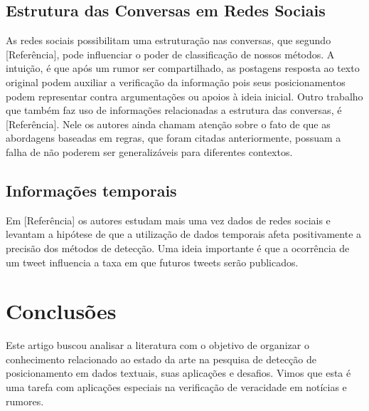 \subsection{Estrutura das Conversas em Redes Sociais}

\quad As redes sociais possibilitam uma estruturação nas conversas, 
que segundo [Referência], pode influenciar o poder de classificação de nossos
métodos. A intuição, é que após um rumor ser compartilhado, as postagens resposta ao
texto original podem auxiliar a verificação da informação pois seus
posicionamentos podem representar contra argumentações ou apoios à ideia
inicial. Outro trabalho que também faz uso de informações relacionadas a
estrutura das conversas, é [Referência]. Nele os autores ainda chamam
atenção sobre o fato de que as abordagens baseadas em regras, que foram
citadas anteriormente, possuam a falha de não poderem ser generalizáveis
para diferentes contextos.

\subsection{Informações temporais}

\quad Em [Referência] os autores estudam mais uma vez dados de redes sociais
e levantam a hipótese de que a utilização de dados temporais afeta
positivamente a precisão dos métodos de detecção. Uma ideia importante é que
a ocorrência de um tweet influencia a taxa em que futuros tweets serão
publicados.

\section{Conclusões}

\quad Este artigo buscou analisar a literatura com o objetivo de organizar
o conhecimento relacionado ao estado da arte na pesquisa de detecção de
posicionamento em dados textuais, suas aplicações e desafios. Vimos que
esta é uma tarefa com aplicações especiais na verificação de veracidade em
notícias e rumores.